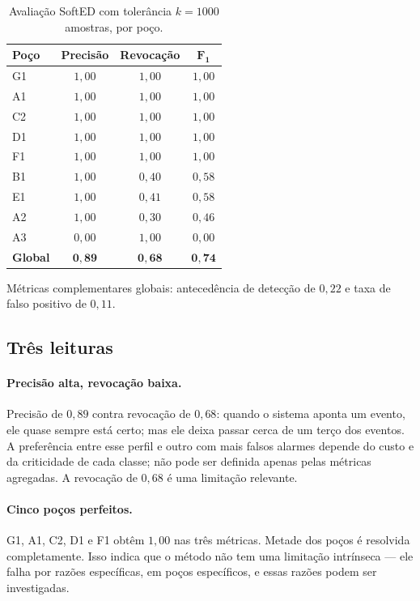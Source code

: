 \begin{table}[htbp]
\centering
\caption{Avaliação SoftED com tolerância $k = 1000$ amostras, por poço.}
\label{tab:seg-softed}
\small
\begin{tabular}{lccc}
\toprule
\textbf{Poço} & \textbf{Precisão} & \textbf{Revocação} & $\bm{F_1}$ \\
\midrule
G1 & $1{,}00$ & $1{,}00$ & $1{,}00$ \\
A1 & $1{,}00$ & $1{,}00$ & $1{,}00$ \\
C2 & $1{,}00$ & $1{,}00$ & $1{,}00$ \\
D1 & $1{,}00$ & $1{,}00$ & $1{,}00$ \\
F1 & $1{,}00$ & $1{,}00$ & $1{,}00$ \\
B1 & $1{,}00$ & $0{,}40$ & $0{,}58$ \\
E1 & $1{,}00$ & $0{,}41$ & $0{,}58$ \\
A2 & $1{,}00$ & $0{,}30$ & $0{,}46$ \\
A3 & $0{,}00$ & $1{,}00$ & $0{,}00$ \\
\midrule
\textbf{Global} & $\bm{0{,}89}$ & $\bm{0{,}68}$ & $\bm{0{,}74}$ \\
\bottomrule
\end{tabular}
\end{table}

Métricas complementares globais: antecedência de detecção de $0{,}22$ e taxa de falso
positivo de $0{,}11$.

\subsection{Três leituras}

\paragraph{Precisão alta, revocação baixa.} Precisão de $0{,}89$ contra revocação de
$0{,}68$: quando o sistema aponta um evento, ele quase sempre está certo; mas ele deixa
passar cerca de um terço dos eventos. A preferência entre esse perfil e outro com mais
falsos alarmes depende do custo e da criticidade de cada classe; não pode ser definida
apenas pelas métricas agregadas. A revocação de $0{,}68$ é uma limitação relevante.

\paragraph{Cinco poços perfeitos.} G1, A1, C2, D1 e F1 obtêm $1{,}00$ nas três métricas.
Metade dos poços é resolvida completamente. Isso indica que o método não tem uma
limitação intrínseca --- ele falha por razões específicas, em poços específicos, e essas
razões podem ser investigadas.

